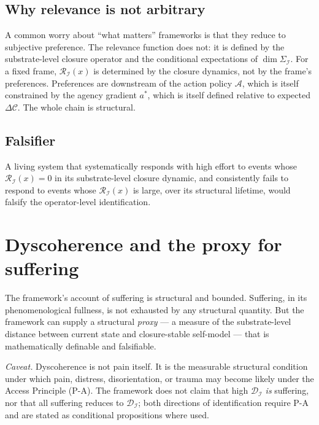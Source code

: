 \documentclass[11pt]{article}
\theoremstyle{plain}
\theoremstyle{definition}
\theoremstyle{remark}
\newcommand{\Ical}{\mathcal{I}}
\newcommand{\Ccal}{\mathcal{C}}
\newcommand{\Acal}{\mathcal{A}}
\newcommand{\Rcal}{\mathcal{R}}
\newcommand{\Dcal}{\mathcal{D}}
\begin{document}
\subsection{Why relevance is not arbitrary}

A common worry about ``what matters'' frameworks is that they reduce to subjective preference. The relevance function does not: it is defined by the substrate-level closure operator and the conditional expectations of $\dim \Sigma_\Ical$. For a fixed frame, $\Rcal_\Ical(x)$ is determined by the closure dynamics, not by the frame's preferences. Preferences are downstream of the action policy $\Acal$, which is itself constrained by the agency gradient $a^*$, which is itself defined relative to expected $\Delta \Ccal$. The whole chain is structural.

\subsection{Falsifier}

A living system that systematically responds with high effort to events whose $\Rcal_\Ical(x) = 0$ in its substrate-level closure dynamic, and consistently fails to respond to events whose $\Rcal_\Ical(x)$ is large, over its structural lifetime, would falsify the operator-level identification.

\section{Dyscoherence and the proxy for suffering}\label{sec:dyscoherence}

The framework's account of suffering is structural and bounded. Suffering, in its phenomenological fullness, is not exhausted by any structural quantity. But the framework can supply a structural \emph{proxy} --- a measure of the substrate-level distance between current state and closure-stable self-model --- that is mathematically definable and falsifiable.

\noindent\emph{Caveat.} Dyscoherence is not pain itself. It is the measurable structural condition under which pain, distress, disorientation, or trauma may become likely under the Access Principle (P-A). The framework does not claim that high $\Dcal_\Ical$ \emph{is} suffering, nor that all suffering reduces to $\Dcal_\Ical$; both directions of identification require P-A and are stated as conditional propositions where used.
\end{document}
